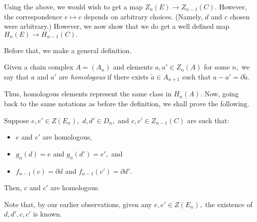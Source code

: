 \documentclass[12pt]{article}
\begin{document}
Using the above, we would wish to get a map $Z_n(E) \to Z_{n-1}(C).$ However, the correspondence $e \mapsto c$ depends on arbitrary choices. (Namely, $d$ and $c$ chosen were arbitrary.) However, we now show that we do get a well defined map $H_n(E) \to H_{n-1}(C).$

Before that, we make a general definition.

\begin{defn}
	Given a chain complex $A = (A_n)$ and elements $a, a' \in Z_n(A)$ for some $n,$ we say that $a$ and $a'$ are \emph{homologous} if there exists $\tilde{a} \in A_{n+1}$ such that $a - a' = \partial \tilde{a}.$
\end{defn}

Thus, homologous elements represent the same class in $H_n(A).$ Now, going back to the same notations as before the definition, we shall prove the following.

\begin{prop}
	Suppose $e, e' \in Z(E_n),$ $d, d' \in D_n,$ and $c, c' \in Z_{n-1}(C)$ are such that:
	\begin{itemize}
		\item $e$ and $e'$ are homologous,
		\item $g_n(d) = e$ and $g_n(d') = e',$ and
		\item $f_{n-1}(c) = \partial d$ and $f_{n-1}(c') = \partial d'.$
	\end{itemize}
	Then, $c$ and $c'$ are homologous.
\end{prop}

Note that, by our earlier observations, given any $e, e' \in Z(E_n),$ the existence of $d, d', c, c'$ is known.
\end{document}
